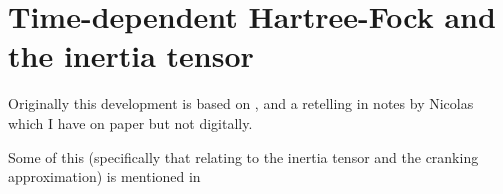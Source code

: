 \chapter{Time-dependent Hartree-Fock and the inertia tensor}

Originally this development is based on \cite{Engel1975}, and a retelling in notes by Nicolas which I have on paper but not digitally.


Some of this (specifically that relating to the inertia tensor and the cranking approximation) is mentioned in \cite{Baran2011}